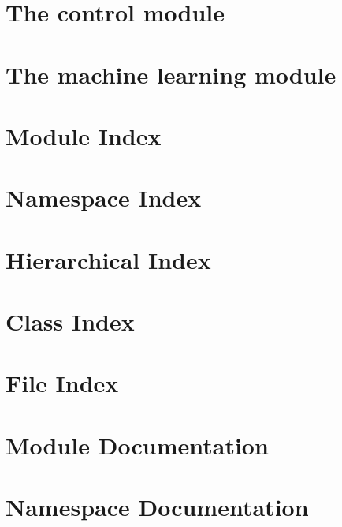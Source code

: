 \documentclass[twoside]{book}
\begin{document}
\chapter{The control module}
\label{controlpage}
\hypertarget{controlpage}{}

\chapter{The machine learning module}
\label{mlpage}
\hypertarget{mlpage}{}

\chapter{Module Index}

\chapter{Namespace Index}

\chapter{Hierarchical Index}

\chapter{Class Index}

\chapter{File Index}

\chapter{Module Documentation}





\chapter{Namespace Documentation}

\end{document}
